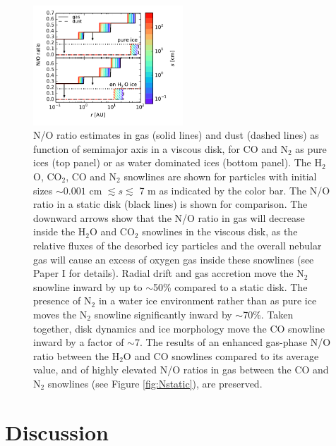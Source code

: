 \documentclass[apj]{emulateapj}
\begin{document}
\begin{figure}[h!]
\centering
\includegraphics[width=0.5\textwidth]{N_O_water_ice_many.pdf}
\caption{N/O ratio estimates in gas (solid lines) and dust (dashed lines) as function of semimajor axis in a viscous disk, for CO and N$_2$ as pure ices (top panel) or as water dominated ices (bottom panel). The H$_2$O, CO$_2$, CO and N$_2$ snowlines are shown for particles with initial sizes $\sim0.001$ cm $\lesssim s \lesssim$ 7 m as indicated by the color bar. The N/O ratio in a static disk (black lines) is shown for comparison. The downward arrows show that the N/O ratio in gas will decrease inside the H$_2$O and CO$_2$ snowlines in the viscous disk, as the relative fluxes of the desorbed icy
particles and the overall nebular gas will cause an excess of oxygen gas inside these snowlines (see Paper I for details). Radial drift and gas accretion move the N$_2$ snowline inward by up to $\sim$50\% compared to a static disk. The presence of N$_2$ in a water ice environment rather than as pure ice moves the N$_2$ snowline significantly inward by $\sim$70\%. Taken together, disk dynamics and ice morphology move the CO snowline inward by a factor of $\sim$7. The results of an enhanced gas-phase N/O ratio between the H$_2$O and CO snowlines compared to its average value, and of highly elevated N/O ratios in gas between the CO and N$_2$ snowlines (see Figure \ref{fig:Nstatic}), are preserved.}  
\label{fig:NO_ratio}
\end{figure}





\section{Discussion}
\label{sec:discussion}
\end{document}
